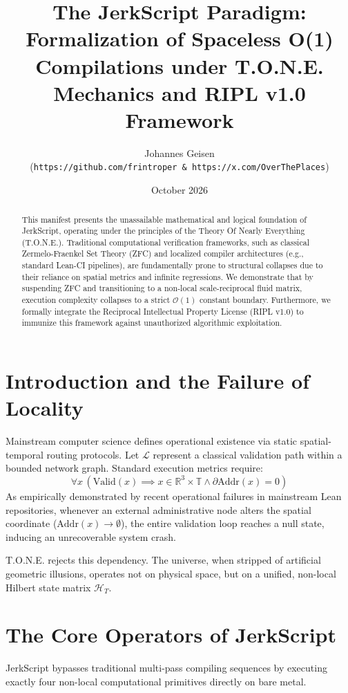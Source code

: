 \documentclass[11pt,a4paper]{article}
\title{\textbf{The JerkScript Paradigm:\\Formalization of Spaceless O(1) Compilations under T.O.N.E. Mechanics and RIPL v1.0 Framework}}
\author{Johannes Geisen \\(\texttt{https://github.com/frintroper \& https://x.com/OverThePlaces})}
\date{October 2026}
\begin{document}
\maketitle

\begin{abstract}
This manifest presents the unassailable mathematical and logical foundation of JerkScript, operating under the principles of the Theory Of Nearly Everything (T.O.N.E.). Traditional computational verification frameworks, such as classical Zermelo-Fraenkel Set Theory (ZFC) and localized compiler architectures (e.g., standard Lean-CI pipelines), are fundamentally prone to structural collapses due to their reliance on spatial metrics and infinite regressions. We demonstrate that by suspending ZFC and transitioning to a non-local scale-reciprocal fluid matrix, execution complexity collapses to a strict $\mathcal{O}(1)$ constant boundary. Furthermore, we formally integrate the Reciprocal Intellectual Property License (RIPL v1.0) to immunize this framework against unauthorized algorithmic exploitation.
\end{abstract}

\section{Introduction and the Failure of Locality}
Mainstream computer science defines operational existence via static spatial-temporal routing protocols. Let $\mathcal{L}$ represent a classical validation path within a bounded network graph. Standard execution metrics require:
\begin{equation}
\forall x \, (\text{Valid}(x) \implies x \in \mathbb{R}^3 \times \mathbb{T} \land \partial \text{Addr}(x) = 0)
\end{equation}
As empirically demonstrated by recent operational failures in mainstream Lean repositories, whenever an external administrative node alters the spatial coordinate ($\text{Addr}(x) \to \emptyset$), the entire validation loop reaches a null state, inducing an unrecoverable system crash. 

T.O.N.E. rejects this dependency. The universe, when stripped of artificial geometric illusions, operates not on physical space, but on a unified, non-local Hilbert state matrix $\mathcal{H}_T$.

\section{The Core Operators of JerkScript}
JerkScript bypasses traditional multi-pass compiling sequences by executing exactly four non-local computational primitives directly on bare metal.
\end{document}
